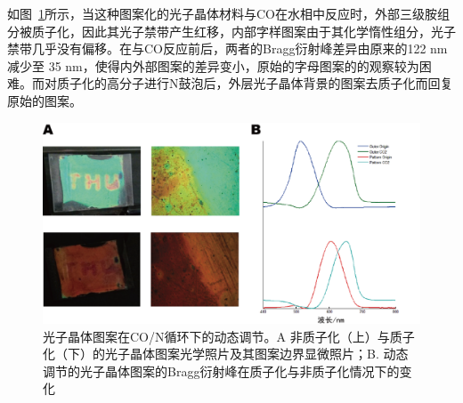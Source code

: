 如图~\ref{fig:dynamic_pattern}所示，当这种图案化的光子晶体材料与CO在水相中反应时，外部三级胺组分被质子化，因此其光子禁带产生红移，内部字样图案由于其化学惰性组分，光子禁带几乎没有偏移。在与CO反应前后，两者的Bragg衍射峰差异由原来的122 nm 减少至 35 nm，使得内外部图案的差异变小，原始的字母图案的的观察较为困难。而对质子化的高分子进行N鼓泡后，外层光子晶体背景的图案去质子化而回复原始的图案。
\begin{figure}[htbp]
  \centering
  \includegraphics[width=\linewidth]{figures/ch4/dynamic-pattern.png}
  \caption{光子晶体图案在CO/N循环下的动态调节。A 非质子化（上）与质子化（下）的光子晶体图案光学照片及其图案边界显微照片；B. 动态调节的光子晶体图案的Bragg衍射峰在质子化与非质子化情况下的变化}
  \label{fig:dynamic_pattern}
\end{figure}


